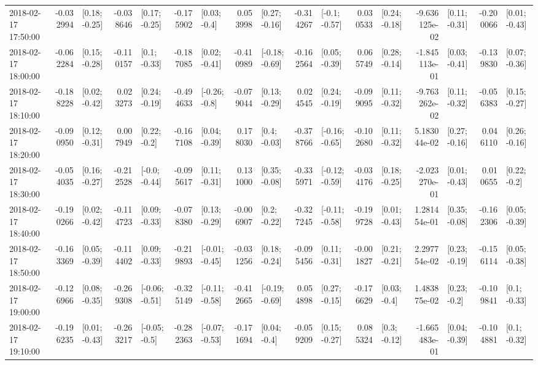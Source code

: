 \begin{tabular}{lrlrlrlrlrlrlrlrl}
2018-02-17 17:50:00 & -0.032994 &   [0.18; -0.25] & -0.038646 &   [0.17; -0.25] & -0.175902 &    [0.03; -0.4] &  0.053998 &   [0.27; -0.16] & -0.314267 &   [-0.1; -0.57] &  0.030533 &   [0.24; -0.18] & -9.636125e-02 &   [0.11; -0.31] & -0.200066 &   [0.01; -0.43] \\
2018-02-17 18:00:00 & -0.062284 &   [0.15; -0.28] & -0.110157 &    [0.1; -0.33] & -0.187085 &   [0.02; -0.41] & -0.410989 &  [-0.18; -0.69] & -0.162564 &   [0.05; -0.39] &  0.065749 &   [0.28; -0.14] & -1.845113e-01 &   [0.03; -0.41] & -0.139830 &   [0.07; -0.36] \\
2018-02-17 18:10:00 & -0.188228 &   [0.02; -0.42] &  0.023273 &   [0.24; -0.19] & -0.494633 &   [-0.26; -0.8] & -0.079044 &   [0.13; -0.29] &  0.024545 &   [0.24; -0.19] & -0.099095 &   [0.11; -0.32] & -9.763262e-02 &   [0.11; -0.32] & -0.056383 &   [0.15; -0.27] \\
2018-02-17 18:20:00 & -0.090950 &   [0.12; -0.31] &  0.007949 &    [0.22; -0.2] & -0.167108 &   [0.04; -0.39] &  0.178030 &    [0.4; -0.03] & -0.378766 &  [-0.16; -0.65] & -0.102680 &   [0.11; -0.32] &  5.183044e-02 &   [0.27; -0.16] &  0.046110 &   [0.26; -0.16] \\
2018-02-17 18:30:00 & -0.054035 &   [0.16; -0.27] & -0.212528 &   [-0.0; -0.44] & -0.095617 &   [0.11; -0.31] &  0.131000 &   [0.35; -0.08] & -0.335971 &  [-0.12; -0.59] & -0.034176 &   [0.18; -0.25] & -2.023270e-01 &   [0.01; -0.43] &  0.010655 &    [0.22; -0.2] \\
2018-02-17 18:40:00 & -0.190266 &   [0.02; -0.42] & -0.114723 &   [0.09; -0.33] & -0.078380 &   [0.13; -0.29] & -0.006907 &    [0.2; -0.22] & -0.327245 &  [-0.11; -0.58] & -0.199728 &   [0.01; -0.43] &  1.281454e-01 &   [0.35; -0.08] & -0.162306 &   [0.05; -0.39] \\
2018-02-17 18:50:00 & -0.163369 &   [0.05; -0.39] & -0.114402 &   [0.09; -0.33] & -0.219893 &  [-0.01; -0.45] & -0.031256 &   [0.18; -0.24] & -0.095456 &   [0.11; -0.31] & -0.001827 &   [0.21; -0.21] &  2.297754e-02 &   [0.23; -0.19] & -0.156114 &   [0.05; -0.38] \\
2018-02-17 19:00:00 & -0.126966 &   [0.08; -0.35] & -0.269308 &  [-0.06; -0.51] & -0.325149 &  [-0.11; -0.58] & -0.412665 &  [-0.19; -0.69] &  0.054898 &   [0.27; -0.15] & -0.176629 &    [0.03; -0.4] &  1.483875e-02 &    [0.23; -0.2] & -0.109841 &    [0.1; -0.33] \\
2018-02-17 19:10:00 & -0.196235 &   [0.01; -0.43] & -0.263217 &   [-0.05; -0.5] & -0.282363 &  [-0.07; -0.53] & -0.171694 &    [0.04; -0.4] & -0.059209 &   [0.15; -0.27] &  0.085324 &    [0.3; -0.12] & -1.665483e-01 &   [0.04; -0.39] & -0.104881 &    [0.1; -0.32] \\

\end{tabular}
